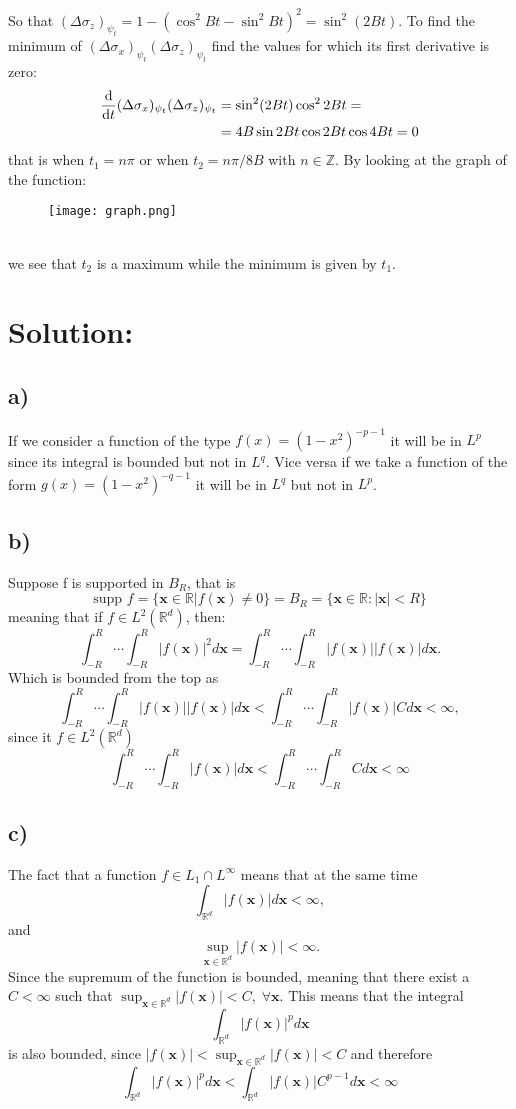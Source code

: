 \documentclass{article}
\begin{document}
So that $(\Delta \sigma_z)_{\psi_t} = 1-(\cos^2{Bt}-\sin^2{Bt})^2 = \sin^2(2Bt)$.
To find the minimum of $(\Delta \sigma_x)_{\psi_t} (\Delta \sigma_z)_{\psi_t}$ find the values for which its first derivative is zero:
\[
    \begin{split}
        \odv{}{t}(\Delta \sigma_x)_{\psi_t} (\Delta \sigma_z)_{\psi_t} &= \sin^2(2Bt) \cos^2{2Bt} =\\
        &= 4B\sin{2Bt}\cos{2Bt}\cos{4Bt} = 0
    \end{split}
\]
that is when $t_1 = n\pi$ or when $t_2 = n\pi/8B$ with $n \in \mathbb{Z}$. By looking at the graph of the function:
\begin{figure}[!ht]
    \centering
    \texttt{[image: graph.png]}
\end{figure}\\
we see that $t_2$ is a maximum while the minimum is given by $t_1$.
\section{Solution:}
\subsection*{a)}
If we consider a function of the type $f(x)= (1-x^2)^{-p-1}$ it will be in $L^p$ since its integral is bounded but not in $L^q$. Vice versa if we take a function of the form $g(x)= (1-x^2)^{-q-1}$ it will be in $L^q$ but not in $L^p$.

\subsection*{b)}
Suppose f is supported in $B_R$, that is
\[
    \mbox{supp }f = \{ \mathbf{x} \in \mathbb{R} | f(\mathbf{x}) \neq 0 \} = B_R = \{ \mathbf{x}\in \mathbb{R} : |\mathbf{x}|<R \}
\]
meaning that if $f \in L^2(\mathbb{R}^d)$, then:
\[
    \int_{-R}^{R}\cdots \int_{-R}^{R} |f(\mathbf{x})|^2 d\mathbf{x} = \int_{-R}^{R}\cdots \int_{-R}^{R} |f(\mathbf{x})||f(\mathbf{x})| d\mathbf{x}.
\]
Which is bounded from the top as
\[
    \int_{-R}^{R}\cdots \int_{-R}^{R} |f(\mathbf{x})||f(\mathbf{x})| d\mathbf{x} < \int_{-R}^{R}\cdots \int_{-R}^{R} |f(\mathbf{x})|C d\mathbf{x} <\infty,
\]
since it $f\in L^2(\mathbb{R}^d)$
\[
    \int_{-R}^{R}\cdots \int_{-R}^{R} |f(\mathbf{x})| d\mathbf{x} < \int_{-R}^{R}\cdots \int_{-R}^{R}C d\mathbf{x} <\infty
\]
\subsection*{c)}
The fact that a function $f \in L_1 \cap L^\infty$ means that at the same time
\[
    \int_{\mathbb{R}^d} |f(\mathbf{x})| d\mathbf{x}< \infty,
\]
and
\[
    \sup_{\mathbf{x} \in \mathbb{R}^d} |f(\mathbf{x})| < \infty .
\]
Since the supremum of the function is bounded, meaning that there exist a $C<\infty$ such that $\sup_{ \mathbf{x} \in \mathbb{R}^d }|f(\mathbf{x})|<C, \; \forall \mathbf{x}$. This means that the integral
\[
    \int_{\mathbb{R}^d} |f(\mathbf{x})|^p d\mathbf{x}
\]
is also bounded, since $|f(\mathbf{x})|< \sup_{ \mathbf{x} \in \mathbb{R}^d }|f(\mathbf{x})| < C$ and therefore
\[
     \int_{\mathbb{R}^d} |f(\mathbf{x})|^p d\mathbf{x} <  \int_{\mathbb{R}^d} |f(\mathbf{x})| C^{p-1} d\mathbf{x} < \infty
\]
\end{document}
